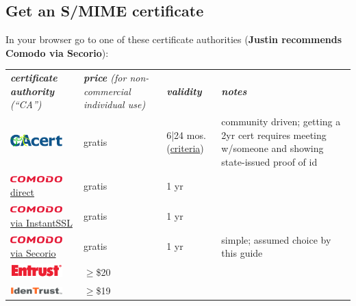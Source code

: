 \documentclass[pdftex,12pt,titlepage=false]{scrartcl}
\newcommand{\secorio}{\href{https://www.secorio.com/}{\includegraphics[width=2cm]{images/logo_comodo.png}\tiny via Secorio}}
\begin{document}
\subsection{Get an S/MIME certificate}\label{catable}
In your browser go to one of these certificate authorities (\textbf{Justin recommends Comodo via Secorio}):\\

\begin{tabular}{lp{2.3cm}l>{\tiny}p{}}
  \slshape\textbf{certificate authority} (``CA'')
  & \slshape\textbf{price} \newline\tiny(for non-commercial individual use)
  & \slshape\textbf{validity}
  & \slshape\normalsize\textbf{notes}\\
  \href{https://www.cacert.org/}{\includegraphics[width=2cm]{images/logo_cacert4.png}} & gratis & 6|24 mos.\tiny (\href{http://wiki.cacert.org/FAQ/Privileges}{criteria}) & community driven; getting a 2yr cert requires meeting w/someone and showing state-issued proof of id\\
  \href{https://secure.comodo.com/products/frontpage?area=SecureEmailCertificate}{\includegraphics[width=2cm]{images/logo_comodo.png}\tiny direct} & gratis & 1 yr &\\
  \href{https://www.instantssl.com/ssl-certificate-products/free-email-certificate.html}{\includegraphics[width=2cm]{images/logo_comodo.png}\tiny via InstantSSL} & gratis & 1 yr &\\
  \secorio & gratis & 1 yr & simple; assumed choice by this guide\\
  \href{https://www.entrust.com/secure-email-certificates/}{\includegraphics[width=2cm]{images/logo_entrust.png}} & $\geq$\$20 & &\\
  \href{https://www.identrust.com/certificates/trustid.html}{\includegraphics[width=2cm]{images/logo_trustid.png}} & $\geq$\$19 & &\\

\end{tabular}
\end{document}
